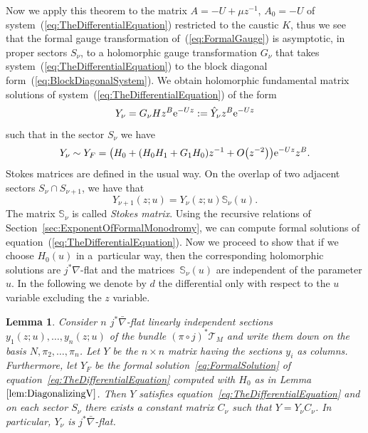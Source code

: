 \documentclass[pdftex]{sigma}
\numberwithin{equation}{section}
\newtheorem{Lemma}[Theorem]{Lemma}
\begin{document}
Now we apply this theorem to the matrix $A=-U+\mu z^{-1}$, $A_{0}=-U$ of system~(\ref{eq:TheDifferentialEquation}) restricted to the caustic $K$, thus we see that the formal gauge transformation of~(\ref{eq:FormalGauge}) is asymptotic, in proper sectors $S_{\nu}$, to a holomorphic gauge transformation $G_{\nu}$ that takes system~(\ref{eq:TheDifferentialEquation}) to the block diagonal form~(\ref{eq:BlockDiagonalSystem}). We obtain holomorphic fundamental matrix solutions of system~(\ref{eq:TheDifferentialEquation}) of the form
\begin{equation}
 \label{eq:CanonicalHolomorphicSolution}
 Y_{\nu}=G_{\nu}Hz^{B}{\rm e}^{-Uz}:=\hat{Y}_{\nu}z^{B}{\rm e}^{-Uz}
\end{equation}
such that in the sector $S_{\nu}$ we have
\begin{equation}
 \label{eq:AsymptoticsOfHolomorphic}
 Y_{\nu}\sim Y_{F}=\bigl(H_{0}+(H_{0}H_{1}+G_{1}H_{0})z^{-1}+O\bigl(z^{-2}\bigr)\bigr){\rm e}^{-Uz}z^{B}.
\end{equation}
Stokes matrices are defined in the usual way. On the overlap of two adjacent sectors $S_{\nu}\cap S_{\nu+1}$, we have that
\begin{equation*}
 Y_{\nu+1}(z;u)=Y_{\nu}(z;u)\mathbb{S}_{\nu}(u).
\end{equation*}
The matrix $\mathbb{S}_{\nu}$ is called \emph{Stokes matrix}. Using the recursive relations of Section~\ref{sec:ExponentOfFormalMonodromy}, we can compute formal solutions of equation~(\ref{eq:TheDifferentialEquation}). Now we proceed to show that if we choose $H_{0}(u)$ in a~particular way, then the corresponding holomorphic solutions are $j^{*}\nabla$-flat and the matrices~$\mathbb{S}_{\nu}(u)$ are independent of the parameter $u$. In the following we denote by $d$ the differential only with respect to the $u$ variable excluding the $z$ variable.
\begin{Lemma}
 Consider $n$ $j^{*}\bar{\nabla}$-flat linearly independent sections $y_{1}(z;u),\dots,y_{n}(z;u)$ of the bundle $(\pi\circ j)^{*}\mathcal{T}_{M}$ and write them down on the basis $N,\pi_{2},\dots,\pi_{n}$. Let $Y$ be the $n\times n$ matrix having the sections $y_{i}$ as columns. Furthermore, let $Y_{F}$ be the formal solution~\eqref{eq:FormalSolution} of equation~\eqref{eq:TheDifferentialEquation} computed with $H_{0}$ as in Lemma~$\ref{lem:DiagonalizingV}$. Then $Y$ satisfies equation~\eqref{eq:TheDifferentialEquation} and on each sector $S_{\nu}$ there exists a constant matrix $C_{\nu}$ such that $Y=Y_{\nu}C_{\nu}$. In particular, $Y_{\nu}$ is $j^{*}\bar{\nabla}$-flat.
\end{Lemma}
\end{document}
